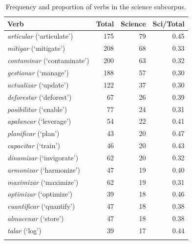 \documentclass[pdflatex,sn-mathphys-num,iicol]{sn-jnl}
\begin{document}
	\begin{table}[h!]
		\caption{Frequency and proportion of verbs in the science subcorpus.}
		\label{tab:verbos_ciencia}
		\footnotesize
		\begin{tabular}{@{}lrrr@{}}
			\toprule
			\textbf{Verb} & \textbf{Total} & \textbf{Science} & \textbf{Sci/Total} \\
			\midrule
			\textit{articular} (`articulate')   & 175 & 79 & 0.45 \\
			\textit{mitigar} (`mitigate')       & 208 & 68 & 0.33 \\
			\textit{contaminar} (`contaminate') & 200 & 63 & 0.32 \\
			\textit{gestionar} (`manage')       & 188 & 57 & 0.30 \\
			\textit{actualizar} (`update')      & 122 & 37 & 0.30 \\
			\textit{deforestar} (`deforest')    & 67  & 26 & 0.39 \\
			\textit{posibilitar} (`enable')     & 77  & 24 & 0.31 \\
			\textit{apalancar} (`leverage')     & 54  & 22 & 0.41 \\
			\textit{planificar} (`plan')        & 43  & 20 & 0.47 \\
			\textit{capacitar} (`train')        & 46  & 20 & 0.43 \\
			\textit{dinamizar} (`invigorate')   & 62  & 20 & 0.32 \\
			\textit{armonizar} (`harmonize')    & 47  & 19 & 0.40 \\
			\textit{maximizar} (`maximize')     & 62  & 19 & 0.31 \\
			\textit{optimizar} (`optimize')     & 39  & 18 & 0.46 \\
			\textit{cuantificar} (`quantify')   & 47  & 18 & 0.38 \\
			\textit{almacenar} (`store')        & 47  & 18 & 0.38 \\
			\textit{talar} (`log')              & 39  & 17 & 0.44 \\
			\botrule
		\end{tabular}
	\end{table}
	
\end{document}
